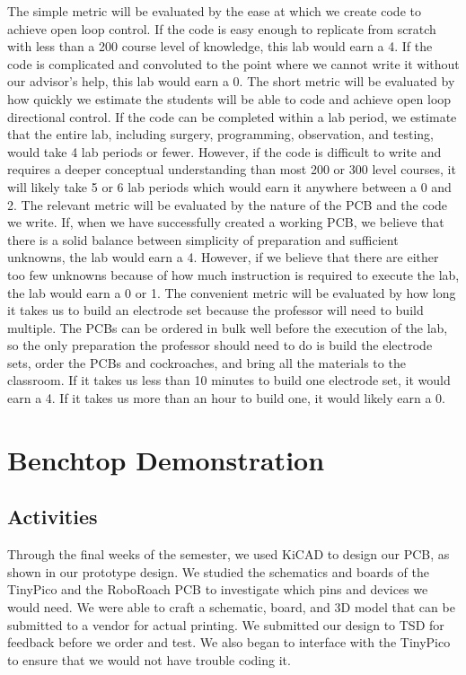 \documentclass{article}
\begin{document}
\bigskip

\par The simple metric will be evaluated by the ease at which we create code to achieve open loop control. If the code is easy enough to replicate from scratch with less than a 200 course level of knowledge, this lab would earn a 4. If the code is complicated and convoluted to the point where we cannot write it without our advisor's help, this lab would earn a 0. The short metric will be evaluated by how quickly we estimate the students will be able to code and achieve open loop directional control. If the code can be completed within a lab period, we estimate that the entire lab, including surgery, programming, observation, and testing, would take 4 lab periods or fewer. However, if the code is difficult to write and requires a deeper conceptual understanding than most 200 or 300 level courses, it will likely take 5 or 6 lab periods which would earn it anywhere between a 0 and 2. The relevant metric will be evaluated by the nature of the PCB and the code we write. If, when we have successfully created a working PCB, we believe that there is a solid balance between simplicity of preparation and sufficient unknowns, the lab would earn a 4. However, if we believe that there are either too few unknowns because of how much instruction is required to execute the lab, the lab would earn a 0 or 1. The convenient metric will be evaluated by how long it takes us to build an electrode set because the professor will need to build multiple. The PCBs can be ordered in bulk well before the execution of the lab, so the only preparation the professor should need to do is build the electrode sets, order the PCBs and cockroaches, and bring all the materials to the classroom. If it takes us less than 10 minutes to build one electrode set, it would earn a 4. If it takes us more than an hour to build one, it would likely earn a 0.

\section{Benchtop Demonstration}

\subsection{Activities}
\par Through the final weeks of the semester, we used KiCAD to design our PCB, as shown in our prototype design. We studied the schematics and boards of the TinyPico and the RoboRoach PCB to investigate which pins and devices we would need. We were able to craft a schematic, board, and 3D model that can be submitted to a vendor for actual printing. We submitted our design to TSD for feedback before we order and test. We also began to interface with the TinyPico to ensure that we would not have trouble coding it.
\end{document}
